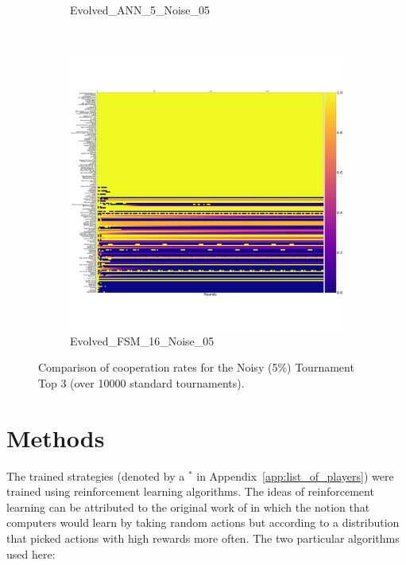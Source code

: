 \documentclass{article}
\begin{document}
\begin{figure}[!hbtp]
\begin{subfigure}[t]{.3\textwidth}
        \caption{Evolved\_ANN\_5\_Noise\_05}
    \end{subfigure}%
    ~
    \begin{subfigure}[t]{.3\textwidth}
        \centering
        \includegraphics[width=\textwidth]{./assets/cooperation_0_0_10000_Evolved_FSM_16_Noise_05_array.pdf}
        \caption{Evolved\_FSM\_16\_Noise\_05}
    \end{subfigure}%

    \caption{Comparison of cooperation rates for the Noisy (5\%) Tournament Top 3
    (over 10000 standard tournaments).}
    \label{fig:comparison_cooperation_heatmaps_noisy}
\end{figure}

\section{Methods}\label{sec:methods}

The trained strategies (denoted by a \(^{*}\) in
Appendix~\ref{app:list_of_players}) were trained using reinforcement
learning algorithms. The ideas of reinforcement learning can be attributed to
the original work of \cite{turing1950computing} in which the notion that
computers would learn by taking random actions but according to a distribution
that picked actions with high rewards more often. The two particular algorithms
used here:
\end{document}
